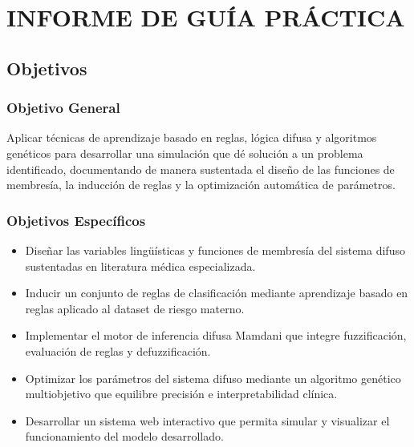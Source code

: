 \documentclass[11pt]{article}
\begin{document}
\section{INFORME DE GUÍA PRÁCTICA}

\titleformat{\section}{\normalfont\Large\bfseries}{\thesection}{1em}{}
\renewcommand{\thesection}{\arabic{section}}

\subsection{Objetivos}

\subsubsection*{Objetivo General}

Aplicar t\'ecnicas de aprendizaje basado en reglas, l\'ogica difusa y algoritmos gen\'eticos para desarrollar una simulaci\'on que d\'e soluci\'on a un problema identificado, documentando de manera sustentada el dise\~no de las funciones de membres\'ia, la inducci\'on de reglas y la optimizaci\'on autom\'atica de par\'ametros.

\subsubsection*{Objetivos Específicos}

\begin{itemize}
    \item Dise\~nar las variables ling\"u\'isticas y funciones de membres\'ia del sistema difuso sustentadas en literatura m\'edica especializada.
    \item Inducir un conjunto de reglas de clasificaci\'on mediante aprendizaje basado en reglas aplicado al dataset de riesgo materno.
    \item Implementar el motor de inferencia difusa Mamdani que integre fuzzificaci\'on, evaluaci\'on de reglas y defuzzificaci\'on.
    \item Optimizar los par\'ametros del sistema difuso mediante un algoritmo gen\'etico multiobjetivo que equilibre precisi\'on e interpretabilidad cl\'inica.
    \item Desarrollar un sistema web interactivo que permita simular y visualizar el funcionamiento del modelo desarrollado.
\end{itemize}
\end{document}
